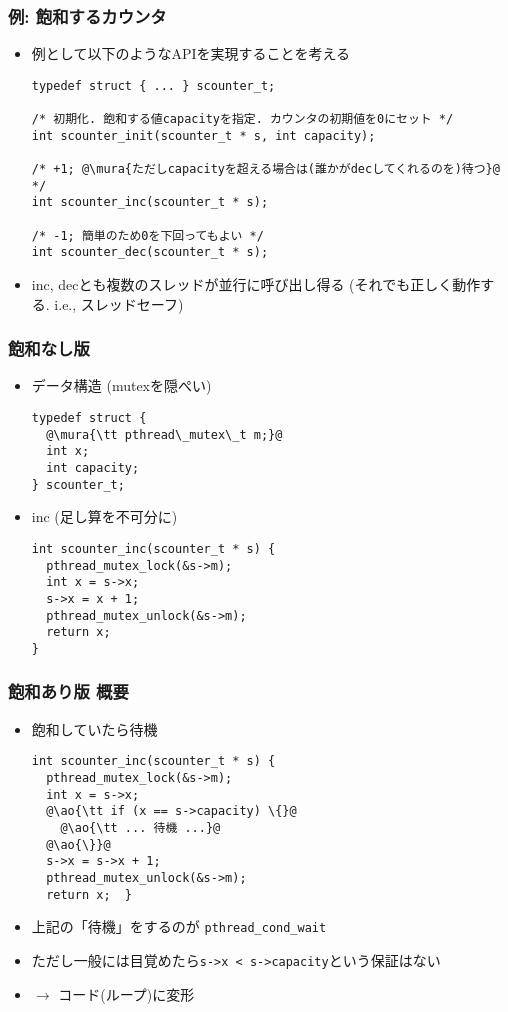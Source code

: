 \documentclass[12pt,dvipdfmx]{beamer}
\begin{document}
\begin{frame}[fragile]
  \frametitle{例: 飽和するカウンタ}
  \begin{itemize}
  \item 例として以下のようなAPIを実現することを考える
\begin{lstlisting}
typedef struct { ... } scounter_t;

/* 初期化. 飽和する値capacityを指定. カウンタの初期値を0にセット */
int scounter_init(scounter_t * s, int capacity);

/* +1; @\mura{ただしcapacityを超える場合は(誰かがdecしてくれるのを)待つ}@ */
int scounter_inc(scounter_t * s);

/* -1; 簡単のため0を下回ってもよい */
int scounter_dec(scounter_t * s);
\end{lstlisting}
\item inc, decとも複数のスレッドが並行に呼び出し得る
  (それでも正しく動作する. i.e., スレッドセーフ)
\end{itemize}
\end{frame}

\begin{frame}[fragile]
  \frametitle{飽和なし版}
  \begin{itemize}
  \item データ構造 (mutexを隠ぺい)
\begin{lstlisting}
typedef struct {
  @\mura{\tt pthread\_mutex\_t m;}@
  int x;
  int capacity;
} scounter_t;
\end{lstlisting}
  \item inc (足し算を不可分に)
\begin{lstlisting}
int scounter_inc(scounter_t * s) {
  pthread_mutex_lock(&s->m);
  int x = s->x;
  s->x = x + 1;
  pthread_mutex_unlock(&s->m);
  return x;
}
\end{lstlisting}
\end{itemize}
\end{frame}

\begin{frame}[fragile]
  \frametitle{飽和あり版 概要}
  \begin{itemize}
  \item 飽和していたら待機
\begin{lstlisting}
int scounter_inc(scounter_t * s) {
  pthread_mutex_lock(&s->m);
  int x = s->x;
  @\ao{\tt if (x == s->capacity) \{}@
    @\ao{\tt ... 待機 ...}@
  @\ao{\}}@
  s->x = s->x + 1;
  pthread_mutex_unlock(&s->m);
  return x;  }
\end{lstlisting}
\item 上記の「待機」をするのが {\tt pthread\_cond\_wait}
\item ただし一般には目覚めたら{\tt s->x < s->capacity}という保証はない
\item $\rightarrow$ コード(ループ)に変形
  \end{itemize}
\end{frame}
\end{document}

